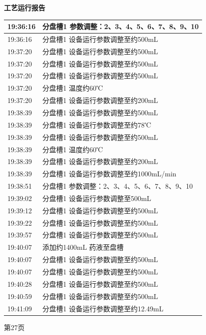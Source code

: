 \documentclass[UTF8,10pt,a4paper,fontset=fandol]{ctexart}
\begin{document}
\noindent
\begin{minipage}[t]{0.48\linewidth}
\centering
\textbf{工艺运行报告}

\smallskip
\begin{tabular}{|p{1.25cm}|p{5.35cm}|}
\hline
19:36:16 & 分盘槽1 参数调整：2、3、4、5、6、7、8、9、10 \\ \hline
19:36:16 & 分盘槽1 设备运行参数调整至约500mL \\ \hline
19:37:20 & 分盘槽1 设备运行参数调整至约500mL \\ \hline
19:37:20 & 分盘槽1 设备运行参数调整至约500mL \\ \hline
19:37:20 & 分盘槽1 设备运行参数调整至约500mL \\ \hline
19:37:20 & 分盘槽1 温度约60℃ \\ \hline
19:37:20 & 分盘槽1 设备运行参数调整至约200mL \\ \hline
19:38:39 & 分盘槽1 设备运行参数调整至约500mL \\ \hline
19:38:39 & 分盘槽1 设备运行参数调整至约78℃ \\ \hline
19:38:39 & 分盘槽1 设备运行参数调整至约500mL \\ \hline
19:38:39 & 分盘槽1 温度约60℃ \\ \hline
19:38:39 & 分盘槽1 设备运行参数调整至约200mL \\ \hline
19:38:39 & 分盘槽1 设备运行参数调整至约1000mL/min \\ \hline
19:38:51 & 分盘槽1 参数调整：2、3、4、5、6、7、8、9、10 \\ \hline
19:39:02 & 分盘槽1 设备运行参数调整至500mL \\ \hline
19:39:12 & 分盘槽1 设备运行参数调整至约500mL \\ \hline
19:39:22 & 分盘槽1 设备运行参数调整至约500mL \\ \hline
19:39:57 & 分盘槽1 设备运行参数调整至约500mL \\ \hline
19:40:07 & 添加约1400mL 药液至盘槽 \\ \hline
19:40:07 & 分盘槽1 设备运行参数调整至约500mL \\ \hline
19:40:07 & 分盘槽1 设备运行参数调整至约500mL \\ \hline
19:40:28 & 分盘槽1 设备运行参数调整至约500mL \\ \hline
19:40:59 & 分盘槽1 设备运行参数调整至约500mL \\ \hline
19:41:09 & 分盘槽1 设备运行参数调整至约12.49mL \\ \hline
\end{tabular}

\medskip
第27页
\end{minipage}
\end{document}

